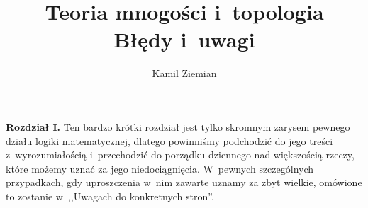 \documentclass[a4paper,11pt]{article}
\title{Teoria mnogości i~topologia \\
  {\Large Błędy i~uwagi}}
\author{Kamil Ziemian}
\begin{document}





\maketitle  %












\vspace{0em}



\vspace{0em}


\noindent
\textbf{Rozdział I.} Ten bardzo krótki rozdział jest tylko skromnym zarysem pewnego działu logiki matematycznej, dlatego powinniśmy podchodzić do jego treści
z~wyrozumiałością i~przechodzić do porządku dziennego nad większością rzeczy, które możemy uznać za jego niedociągnięcia. W~pewnych szczególnych przypadkach,
gdy uproszczenia w~nim zawarte uznamy za zbyt wielkie, omówione to zostanie w~,,Uwagach do konkretnych stron''.

\vspace{\spaceFour}












\vspace{0em}
\end{document}
